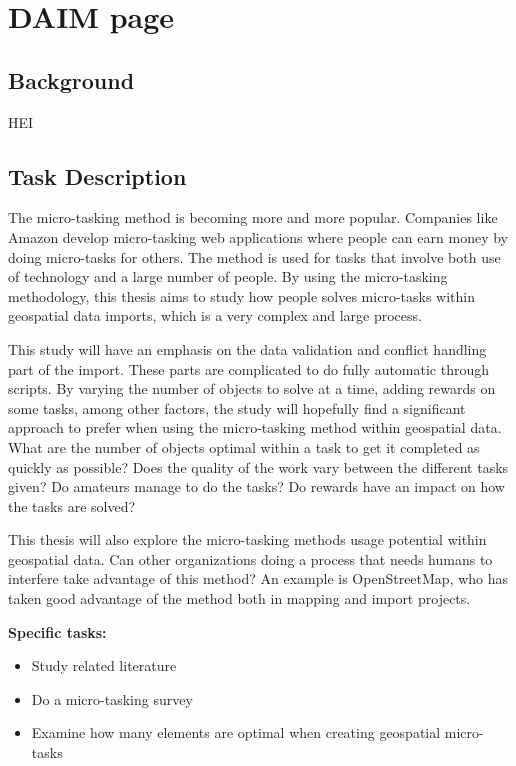 \chapter*{DAIM page}

\section*{Background}
HEI

\section*{Task Description}

The micro-tasking method is becoming more and more popular. Companies like Amazon develop micro-tasking web applications where people can earn money by doing micro-tasks for others. The method is used for tasks that involve both use of technology and a large number of people. By using the micro-tasking methodology, this thesis aims to study how people solves micro-tasks within geospatial data imports, which is a very complex and large process. 

This study will have an emphasis on the data validation and conflict handling part of the import. These parts are complicated to do fully automatic through scripts. By varying the number of objects to solve at a time, adding rewards on some tasks, among other factors, the study will hopefully find a significant approach to prefer when using the micro-tasking method within geospatial data. What are the number of objects optimal within a task to get it completed as quickly as possible? Does the quality of the work vary between the different tasks given? Do amateurs manage to do the tasks? Do rewards have an impact on how the tasks are solved? 

This thesis will also explore the micro-tasking methods usage potential within geospatial data. Can other organizations doing a process that needs humans to interfere take advantage of this method? An example is OpenStreetMap, who has taken good advantage of the method both in mapping and import projects.

\textbf{Specific tasks:}
\begin{itemize}
	\item Study related literature
	\item Do a micro-tasking survey
	\item Examine how many elements are optimal when creating geospatial micro-tasks
\end{itemize}